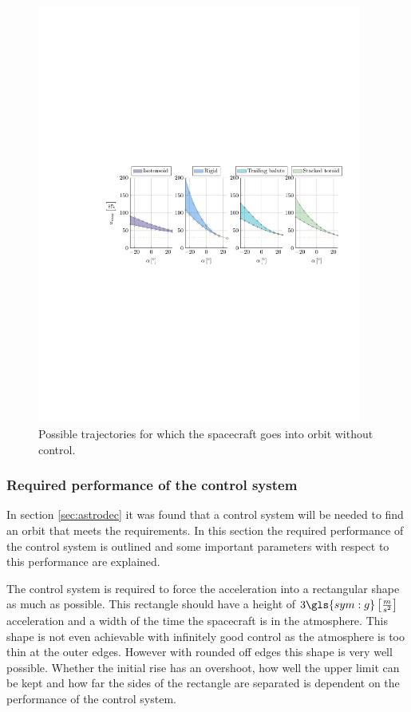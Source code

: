 \begin{figure}[h]
	\centering
	\includegraphics[trim={4.25cm 10.5cm 1cm 10.5cm},clip,width=0.95\textwidth]{Figure/orbital_model/n_alpha.pdf}
	\caption{Possible trajectories for which the spacecraft goes into orbit without control.}
	\label{fig:n_alpha}
\end{figure}

\subsubsection{Required performance of the control system}
\label{sec:astroperfomance}

In section \ref{sec:astrodec} it was found that a control system will be needed to find an orbit that meets the requirements. In this section the required performance of the control system is outlined and some important parameters with respect to this performance are explained.

The control system is required to force the acceleration into a rectangular shape as much as possible. This rectangle should have a height of $3 \gls{sym:g} \left[\frac{m}{s^2}\right]$ acceleration and a width of the time the spacecraft is in the atmosphere. This shape is not even achievable with infinitely good control as the atmosphere is too thin at the outer edges. However with rounded off edges this shape is very well possible. Whether the initial rise has an overshoot, how well the upper limit can be kept and how far the sides of the rectangle are separated is dependent on the performance of the control system.


